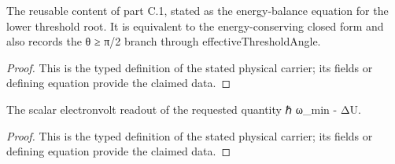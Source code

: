 \begin{definition}
  \label{def:physics:IPhO_2026_1_C_2:aux019}
  The reusable content of part C.1, stated as the energy-balance equation for the lower threshold root. It is equivalent to the energy-conserving closed form and also records the θ ≥ π/2 branch through effectiveThresholdAngle.
\end{definition}
\begin{proof}
  This is the typed definition of the stated physical carrier; its fields or defining equation provide the claimed data.
\end{proof}

\begin{definition}
  \label{def:physics:IPhO_2026_1_C_2:aux020}
  The scalar electronvolt readout of the requested quantity ℏ ω\_min - ΔU.
\end{definition}
\begin{proof}
  This is the typed definition of the stated physical carrier; its fields or defining equation provide the claimed data.
\end{proof}
